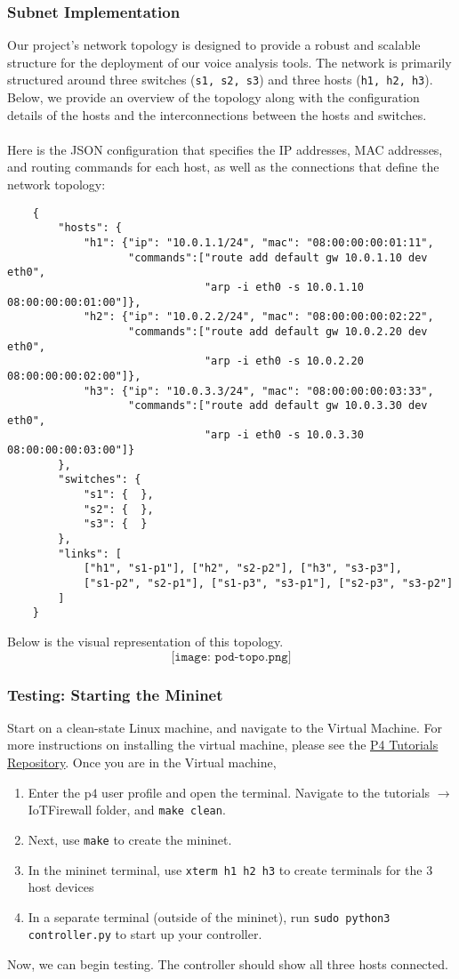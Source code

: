 \subsubsection{Subnet Implementation}
Our project's network topology is designed to provide a robust and scalable structure for the deployment of our voice analysis tools. The network is primarily structured around three switches (\verb|s1, s2, s3|) and three hosts (\verb|h1, h2, h3|). Below, we provide an overview of the topology along with the configuration details of the hosts and the interconnections between the hosts and switches.\\
\\
Here is the JSON configuration that specifies the IP addresses, MAC addresses, and routing commands for each host, as well as the connections that define the network topology:
\begin{lstlisting}
    {
        "hosts": {
            "h1": {"ip": "10.0.1.1/24", "mac": "08:00:00:00:01:11",
                   "commands":["route add default gw 10.0.1.10 dev eth0",
                               "arp -i eth0 -s 10.0.1.10 08:00:00:00:01:00"]},
            "h2": {"ip": "10.0.2.2/24", "mac": "08:00:00:00:02:22",
                   "commands":["route add default gw 10.0.2.20 dev eth0",
                               "arp -i eth0 -s 10.0.2.20 08:00:00:00:02:00"]},
            "h3": {"ip": "10.0.3.3/24", "mac": "08:00:00:00:03:33",
                   "commands":["route add default gw 10.0.3.30 dev eth0",
                               "arp -i eth0 -s 10.0.3.30 08:00:00:00:03:00"]}
        },
        "switches": {
            "s1": {  },
            "s2": {  },
            "s3": {  }
        },
        "links": [
            ["h1", "s1-p1"], ["h2", "s2-p2"], ["h3", "s3-p3"],
            ["s1-p2", "s2-p1"], ["s1-p3", "s3-p1"], ["s2-p3", "s3-p2"]
        ]
    }
\end{lstlisting}
Below is the visual representation of this topology.
$$
\texttt{[image: pod-topo.png]}
$$
\subsubsection{Testing: Starting the Mininet}
Start on a clean-state Linux machine, and navigate to the Virtual Machine. For more instructions on installing the virtual machine, please see the \href{https://github.com/p4lang/tutorials?tab=readme-ov-file#obtaining-required-software}{\underline{P4 Tutorials Repository}}. Once you are in the Virtual machine,
\begin{enumerate}
    \item Enter the p$4$ user profile and open the terminal. Navigate to the tutorials $\rightarrow$ IoTFirewall folder, and \verb|make clean|.
    \item Next, use \verb|make| to create the mininet.
    \item In the mininet terminal, use \verb|xterm h1 h2 h3| to create terminals for the 3 host devices
    \item In a separate terminal (outside of the mininet), run \verb|sudo python3 controller.py| to start up your controller.
\end{enumerate}
Now, we can begin testing. The controller should show all three hosts connected.
